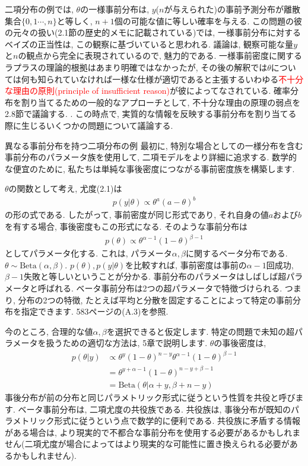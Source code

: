 \documentclass[10pt,dvipdfmx,a4]{beamer}
\newcommand{\eqn}[1]{\begin{align*}#1\end{align*}}
\newcommand{\tcr}[1]{\textcolor{red}{#1}}
\begin{document}

\begin{frame}
二項分布の例では, $\theta$の一様事前分布は, $y$($n$が与えられた)の事前予測分布が離散集合$\{0,1\cdots,n\}$と等しく, $n+1$個の可能な値に等しい確率を与える.
この問題の彼の元々の扱い(2.1節の歴史的メモに記載されている)では, 一様事前分布に対するベイズの正当性は, この観察に基づいていると思われる.
議論は, 観察可能な量$y$と$n$の観点から完全に表現されているので, 魅力的である.
一様事前密度に関するラプラスの理論的根拠はあまり明確ではなかったが, その後の解釈では$\theta$については何も知られていなければ一様な仕様が適切であると主張するいわゆる\tcr{不十分な理由の原則(principle of insufficient reason)}が彼によってなされている.
確率分布を割り当てるための一般的なアプローチとして, 不十分な理由の原理の弱点を2.8節で議論する.
.
この時点で, 実質的な情報を反映する事前分布を割り当てる際に生じるいくつかの問題について議論する.
\end{frame}


\begin{frame}{異なる事前分布を持つ二項分布の例}
最初に, 特別な場合としての一様分布を含む事前分布のパラメータ族を使用して, 二項モデルをより詳細に追求する.
数学的な便宜のために, 私たちは単純な事後密度につながる事前密度族を構築します.

$\theta$の関数として考え, 尤度(2.1)は
\eqn{p(y|\theta)\propto \theta^a(a-\theta)^b}
の形の式である.
したがって, 事前密度が同じ形式であり, それ自身の値$a$および$b$を有する場合, 事後密度もこの形式になる.
そのような事前分布は
\eqn{p(\theta)\propto \theta^{\alpha-1}(1-\theta)^{\beta-1}}
としてパラメータ化する.
これは, パラメータ$\alpha, \beta$に関するベータ分布である.$\theta\sim \text{Beta}(\alpha,\beta)$.
$p(\theta), p(y|\theta)$を比較すれば, 事前密度は事前の$\alpha-1$回成功, $\beta-1$失敗と等しいということが分かる.
事前分布のパラメータはしばしば超パラメータと呼ばれる.
ベータ事前分布は2つの超パラメータで特徴づけられる.
つまり, 分布の2つの特徴, たとえば平均と分散を固定することによって特定の事前分布を指定できます.
583ページの(A.3)を参照.
\end{frame}


\begin{frame}
今のところ, 合理的な値$\alpha, \beta$を選択できると仮定します.
特定の問題で未知の超パラメータを扱うための適切な方法は, 5章で説明します.
$\theta$の事後密度は,
\eqn{p(\theta|y)&\propto \theta^y(1-\theta)^{n-y}\theta^{\alpha-1}(1-\theta)^{\beta-1}\\
&=\theta^{y+\alpha-1}(1-\theta)^{n-y+\beta-1}\\
&=\text{Beta}(\theta|\alpha+y,\beta+n-y)}
事後分布が前の分布と同じパラメトリック形式に従うという性質を共役と呼びます.
ベータ事前分布は, 二項尤度の共役族である.
共役族は, 事後分布が既知のパラメトリック形式に従うという点で数学的に便利である.
共役族に矛盾する情報がある場合は, より現実的で不都合な事前分布を使用する必要があるかもしれません(二項尤度が場合によってはより現実的な可能性に置き換えられる必要があるかもしれません).
\end{frame}
\end{document}
